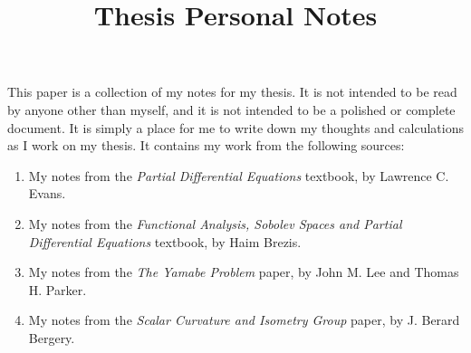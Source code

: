\documentclass[notitlepage]{report}
\author{}
\date{}
\title{Thesis Personal Notes}
\theoremstyle{definition}
\begin{document}
  \maketitle
  \tableofcontents

  \begin{note*}
    This paper is a collection of my notes for my thesis. It is not intended to be read by anyone other than myself, and it is not intended to be a polished or complete document. It is simply a place for me to write down my thoughts and calculations as I work on my thesis. It contains my work from the following sources:
    \begin{enumerate}
      \item My notes from the \emph{Partial Differential Equations} textbook, by Lawrence C. Evans.
      \item My notes from the \emph{Functional Analysis, Sobolev Spaces and Partial Differential Equations} textbook, by Haim Brezis.
      \item My notes from the \emph{The Yamabe Problem} paper, by John M. Lee and Thomas H. Parker.
      \item My notes from the \emph{Scalar Curvature and Isometry Group} paper, by J. Berard Bergery.
    \end{enumerate}
  \end{note*}

  
  
  
  
  
  
  
  
  
  
\end{document}

